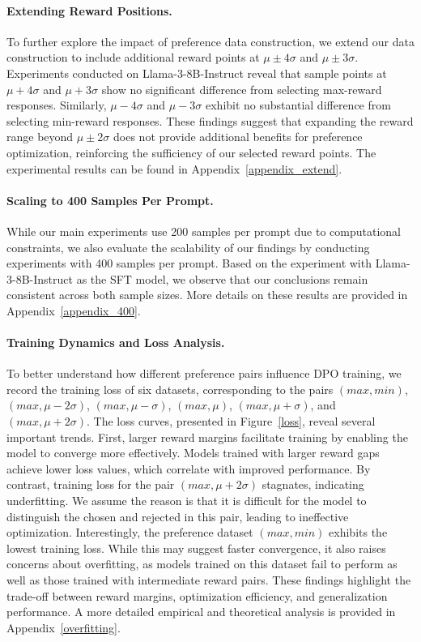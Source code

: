 \paragraph{Extending Reward Positions.}
To further explore the impact of preference data construction, we extend our data construction to include additional reward points at \(\mu \pm 4\sigma\) and \(\mu \pm 3\sigma\). 
Experiments conducted on Llama-3-8B-Instruct reveal that sample points at \(\mu + 4\sigma\) and \(\mu + 3\sigma\) show no significant difference from selecting max-reward responses. 
Similarly, \(\mu - 4\sigma\) and \(\mu - 3\sigma\) exhibit no substantial difference from selecting min-reward responses. 
These findings suggest that expanding the reward range beyond \(\mu \pm 2\sigma\) does not provide additional benefits for preference optimization, reinforcing the sufficiency of our selected reward points.
The experimental results can be found in Appendix~\ref{appendix_extend}.

\paragraph{Scaling to 400 Samples Per Prompt.}
While our main experiments use 200 samples per prompt due to computational constraints, we also evaluate the scalability of our findings by conducting experiments with 400 samples per prompt. 
Based on the experiment with Llama-3-8B-Instruct as the SFT model, we observe that our conclusions remain consistent across both sample sizes.
More details on these results are provided in Appendix~\ref{appendix_400}.  

\paragraph{Training Dynamics and Loss Analysis.}
To better understand how different preference pairs influence DPO training, we record the training loss of six datasets, corresponding to the pairs \((max, min)\), \((max, \mu - 2\sigma)\), \((max, \mu - \sigma)\), \((max, \mu)\), \((max, \mu + \sigma)\), and \((max, \mu + 2\sigma)\). 
The loss curves, presented in Figure~\ref{loss}, reveal several important trends. 
First, larger reward margins facilitate training by enabling the model to converge more effectively. 
Models trained with larger reward gaps achieve lower loss values, which correlate with improved performance. 
By contrast, training loss for the pair \((max, \mu + 2\sigma)\) stagnates, indicating underfitting. 
We assume the reason is that it is difficult for the model to distinguish the chosen and rejected in this pair, leading to ineffective optimization.  
Interestingly, the preference dataset \((max, min)\) exhibits the lowest training loss. 
While this may suggest faster convergence, it also raises concerns about overfitting, as models trained on this dataset fail to perform as well as those trained with intermediate reward pairs. These findings highlight the trade-off between reward margins, optimization efficiency, and generalization performance. 
A more detailed empirical and theoretical analysis is provided in Appendix~\ref{overfitting}.  


